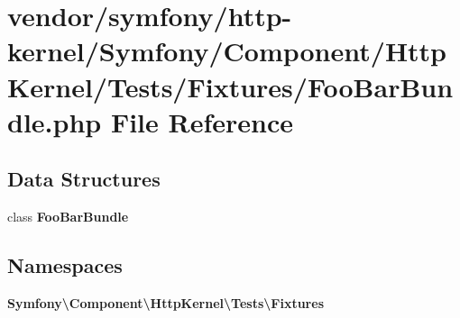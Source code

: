 \section{vendor/symfony/http-\/kernel/\+Symfony/\+Component/\+Http\+Kernel/\+Tests/\+Fixtures/\+Foo\+Bar\+Bundle.php File Reference}
\label{_foo_bar_bundle_8php}
\subsection*{Data Structures}
\begin{DoxyCompactItemize}
\item 
class {\bf Foo\+Bar\+Bundle}
\end{DoxyCompactItemize}
\subsection*{Namespaces}
\begin{DoxyCompactItemize}
\item 
 {\bf Symfony\textbackslash{}\+Component\textbackslash{}\+Http\+Kernel\textbackslash{}\+Tests\textbackslash{}\+Fixtures}
\end{DoxyCompactItemize}
